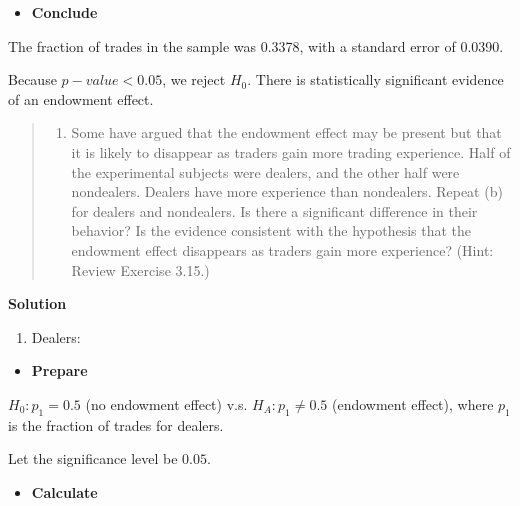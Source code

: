 \documentclass[
]{book}
\newenvironment{Shaded}{\begin{snugshade}}{\end{snugshade}}
\newcommand{\CommentTok}[1]{\textcolor[rgb]{0.56,0.35,0.01}{\textit{#1}}}
\newcommand{\DecValTok}[1]{\textcolor[rgb]{0.00,0.00,0.81}{#1}}
\newcommand{\KeywordTok}[1]{\textcolor[rgb]{0.13,0.29,0.53}{\textbf{#1}}}
\newcommand{\NormalTok}[1]{#1}
\newcommand{\OperatorTok}[1]{\textcolor[rgb]{0.81,0.36,0.00}{\textbf{#1}}}
\newcommand{\StringTok}[1]{\textcolor[rgb]{0.31,0.60,0.02}{#1}}
\providecommand{\tightlist}{%
  \setlength{\itemsep}{0pt}\setlength{\parskip}{0pt}}
\begin{document}
\begin{itemize}
\tightlist
\item
  \textbf{Conclude}
\end{itemize}

The fraction of trades in the sample was 0.3378, with a standard error of 0.0390.

Because \(p-value < 0.05\), we reject \(H_0\). There is statistically significant evidence of an endowment effect.

\begin{quote}
\begin{enumerate}
\def\labelenumi{\alph{enumi}.}
\setcounter{enumi}{2}
\tightlist
\item
  Some have argued that the endowment effect may be present but that it is likely to disappear as traders gain more trading experience. Half of the experimental subjects were dealers, and the other half were nondealers. Dealers have more experience than nondealers. Repeat (b) for dealers and nondealers. Is there a significant difference in their behavior? Is the evidence consistent with the hypothesis that the endowment effect disappears as traders gain more experience? (Hint: Review Exercise 3.15.)
\end{enumerate}
\end{quote}

\textbf{Solution}

\begin{enumerate}
\def\labelenumi{\roman{enumi}.}
\tightlist
\item
  Dealers:
\end{enumerate}

\begin{itemize}
\tightlist
\item
  \textbf{Prepare}
\end{itemize}

\(H_0: p_1 = 0.5\) (no endowment effect) v.s. \(H_A: p_1 \neq 0.5\) (endowment effect), where \(p_1\) is the fraction of trades for dealers.

Let the significance level be \(0.05\).

\begin{itemize}
\tightlist
\item
  \textbf{Calculate}
\end{itemize}

\begin{Shaded}
\end{Shaded}
\end{document}
